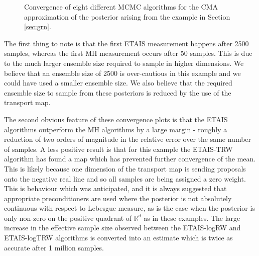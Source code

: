 \documentclass[final]{siamltex}
\begin{document}
\begin{figure}[!htb]
\centering
{}
\caption{Convergence of eight different MCMC algorithms for the CMA
  approximation of the  posterior arising from the example in Section \ref{sec:grn}.}
\label{fig:grn_L2}
\end{figure}

The first thing to note is that the first ETAIS measurement happens
after 2500 samples, whereas the first MH measurement occurs after 50
samples. This is due to the much larger ensemble size required to
sample in higher dimensions. We believe that an ensemble size of 2500
is over-cautious in this example and we could have used a smaller
ensemble size. We also believe that the required ensemble size to sample
from these posteriors is reduced by the use of the transport map.

The second obvious feature of these convergence plots is that the ETAIS
algorithms outperform the MH algorithms by a large margin - roughly a
reduction of two orders of magnitude in the relative error over the
same number of samples. A less positive result is that for this
example the ETAIS-TRW algorithm has found a map which has prevented
further convergence of the mean. This is likely because one dimension
of the transport map is sending proposals onto the negative real line
and so all samples are being assigned a zero weight. This is behaviour
which was anticipated, and it is always suggested that appropriate
preconditioners are used where the posterior is not absolutely
continuous with respect to Lebesgue measure, as is the case when the
posterior is only non-zero on the positive quadrant of $\mathbb{R}^d$
as in these examples. The large increase in the effective sample size
observed between the ETAIS-logRW and ETAIS-logTRW algorithms is
converted into an estimate which is twice as accurate after 1 million
samples. 
\end{document}
